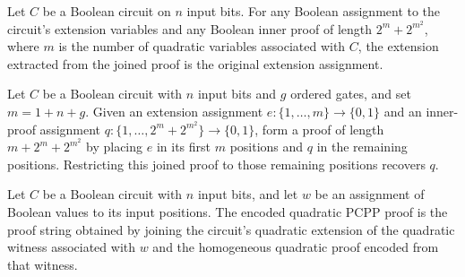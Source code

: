 \begin{theorem}
\label{FABL.BooleanCircuit.circuitQuadraticExtensionProof_join}
\leanok
{}
Let $C$ be a Boolean circuit on $n$ input bits. For any Boolean assignment to the
circuit’s extension variables and any Boolean inner proof of length $2^m+2^{m^2}$, where
$m$ is the number of quadratic variables associated with $C$, the extension extracted
from the joined proof is the original extension assignment.
\end{theorem}

\begin{theorem}
\label{FABL.BooleanCircuit.circuitQuadraticInnerProof_join}
\leanok
{}
Let $C$ be a Boolean circuit with $n$ input bits and $g$ ordered gates, and set
$m=1+n+g$. Given an extension assignment $e\colon\{1,\ldots,m\}\to\{0,1\}$ and an
inner-proof assignment $q\colon\{1,\ldots,2^m+2^{m^2}\}\to\{0,1\}$, form a proof of
length $m+2^m+2^{m^2}$ by placing $e$ in its first $m$ positions and $q$ in the
remaining positions. Restricting this joined proof to those remaining positions recovers
$q$.
\end{theorem}

\begin{definition}
\label{FABL.BooleanCircuit.encodeCircuitQuadraticPCPPProof}
\leanok
{}
Let $C$ be a Boolean circuit with $n$ input bits, and let $w$ be an assignment of
Boolean values to its input positions. The encoded quadratic PCPP proof is the proof
string obtained by joining the circuit’s quadratic extension of the quadratic witness
associated with $w$ and the homogeneous quadratic proof encoded from that witness.
\end{definition}

